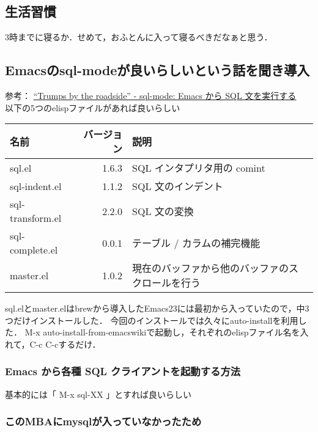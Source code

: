 \documentclass[11pt]{article}
\begin{document}
\subsection{生活習慣}
\label{sec-5-3}

3時までに寝るか．せめて，おふとんに入って寝るべきだなぁと思う．
\subsection{Emacsのsql-modeが良いらしいという話を聞き導入}
\label{sec-5-4}



参考： \href{http://www.sixnine.net/roadside/sqlmode.html}{``Trumps by the roadside'' - sql-mode: Emacs から SQL 文を実行する} \\
以下の5つのelispファイルがあれば良いらしい

\begin{center}
\begin{tabular}{lrl}
\hline
 名前              &  バージョン  &  説明                                              \\
\hline
 sql.el            &       1.6.3  &  SQL インタプリタ用の comint                       \\
 sql-indent.el     &       1.1.2  &  SQL 文のインデント                                \\
 sql-transform.el  &       2.2.0  &  SQL 文の変換                                      \\
 sql-complete.el   &       0.0.1  &  テーブル / カラムの補完機能                       \\
 master.el         &       1.0.2  &  現在のバッファから他のバッファのスクロールを行う  \\
\hline
\end{tabular}
\end{center}



sql.elとmaster.elはbrewから導入したEmacs23には最初から入っていたので，中3つだけインストールした．
今回のインストールでは久々にauto-installを利用した．
M-x auto-install-from-emacswikiで起動し，それぞれのelispファイル名を入れて，C-c C-cするだけ．
\subsubsection{Emacs から各種 SQL クライアントを起動する方法}
\label{sec-5-4-1}

基本的には「 M-x sql-XX 」とすれば良いらしい
\subsubsection{このMBAにmysqlが入っていなかったため}
\label{sec-5-4-2}
\end{document}
